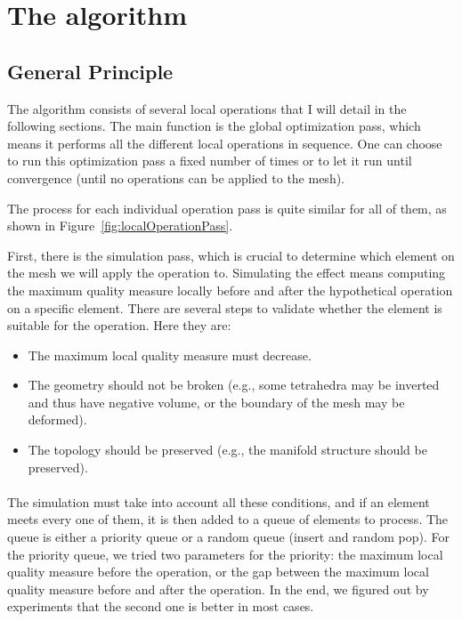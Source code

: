 \documentclass[11pt]{article}
\begin{document}
\section{The algorithm}

\subsection{General Principle}

The algorithm consists of several local operations that I will detail in the following sections. The main function is the global optimization pass, which means it performs all the different local operations in sequence. One can choose to run this optimization pass a fixed number of times or to let it run until convergence (until no operations can be applied to the mesh).

The process for each individual operation pass is quite similar for all of them, as shown in Figure~\ref{fig:localOperationPass}.

First, there is the simulation pass, which is crucial to determine which element on the mesh we will apply the operation to. Simulating the effect means computing the maximum quality measure locally before and after the hypothetical operation on a specific element. There are several steps to validate whether the element is suitable for the operation. Here they are:

\begin{itemize}
	\item The maximum local quality measure must decrease.
	\item The geometry should not be broken (e.g., some tetrahedra may be inverted and thus have negative volume, or the boundary of the mesh may be deformed).
	\item The topology should be preserved (e.g., the manifold structure should be preserved).
\end{itemize}

\paragraph{}The simulation must take into account all these conditions, and if an element meets every one of
them, it is then added to a queue of elements to process. The queue is either a priority queue or a random
queue (insert and random pop). For the priority queue, we tried two parameters for the priority: the maximum
local quality measure before the operation, or the gap between the maximum local quality measure before and
after the operation. In the end, we figured out by experiments that the second one is better in most
cases.\label{par:greedyParameters}
\end{document}
